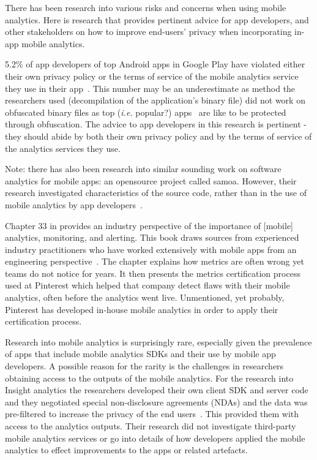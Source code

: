 There has been research into various risks and concerns when using mobile analytics. Here is research that provides pertinent advice for app developers, and other stakeholders on how to improve end-users' privacy when incorporating in-app mobile analytics.

5.2\% of app developers of top Android apps in Google Play have violated either their own privacy policy or the terms of service of the mobile analytics service they use in their app~. This number may be an underestimate as method the researchers used (decompilation of the application's binary file) did not work on obfuscated binary files as top (\emph{i.e.} popular?) apps~ are like to be protected through obfuscation. The advice to app developers in this research is pertinent - they should abide by both their own privacy policy and by the terms of service of the analytics services they use.

Note: there has also been research into similar sounding work on software analytics for mobile apps: an opensource project called \Gls{samoa}. However, their research investigated characteristics of the source code, rather than in the use of mobile analytics by app developers~.

Chapter 33 in  provides an industry perspective of the importance of [mobile] analytics, monitoring, and alerting. This book draws sources from experienced industry practitioners who have worked extensively with mobile apps from an engineering perspective~. The chapter explains how metrics are often wrong yet teams do not notice for years. It then presents the metrics certification process used at Pinterest which helped that company detect flaws with their mobile analytics, often before the analytics went live. Unmentioned, yet probably, Pinterest has developed in-house mobile analytics in order to apply their certification process.

Research into mobile analytics is surprisingly rare, especially given the prevalence of apps that include mobile analytics SDKs and their use by mobile app developers. A possible reason for the rarity is the challenges in researchers obtaining access to the outputs of the mobile analytics. For the research into Insight analytics the researchers developed their own client SDK and server code and they negotiated special non-disclosure agreements (NDAs) and the data was pre-filtered to increase the privacy of the end users~. This provided them with access to the analytics outputs. Their research did not investigate third-party mobile analytics services or go into details of how developers applied the mobile analytics to effect improvements to the apps or related artefacts.

